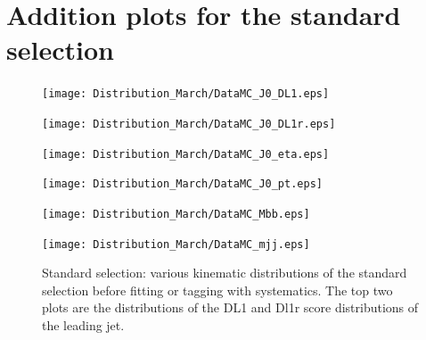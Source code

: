 \documentclass[letterpaper,12pt]{article}
\begin{document}
\section{Addition plots for the standard selection}
\begin{figure}[h]
\begin{minipage}[b]{.45\textwidth}
\centering
\texttt{[image: Distribution\_March/DataMC\_J0\_DL1.eps]}
\end{minipage}\hfill
\begin{minipage}[b]{.45\textwidth}
\centering
\texttt{[image: Distribution\_March/DataMC\_J0\_DL1r.eps]}
\end{minipage}\hfill
\begin{minipage}[b]{.45\textwidth}
\centering
\texttt{[image: Distribution\_March/DataMC\_J0\_eta.eps]}
\end{minipage}\hfill
\begin{minipage}[b]{.45\textwidth}
\centering
\texttt{[image: Distribution\_March/DataMC\_J0\_pt.eps]}
\end{minipage}\hfill
\begin{minipage}[b]{.45\textwidth}
\centering
\texttt{[image: Distribution\_March/DataMC\_Mbb.eps]}
\end{minipage}\hfill
\begin{minipage}[b]{.45\textwidth}
\centering
\texttt{[image: Distribution\_March/DataMC\_mjj.eps]}
\end{minipage}
\caption{Standard selection: various kinematic distributions of the standard 
selection before fitting or tagging with systematics. The top two plots are 
the distributions of the DL1 and Dl1r score distributions of the leading jet.} \label{fig:standard_selection}
\end{figure}
\end{document}

